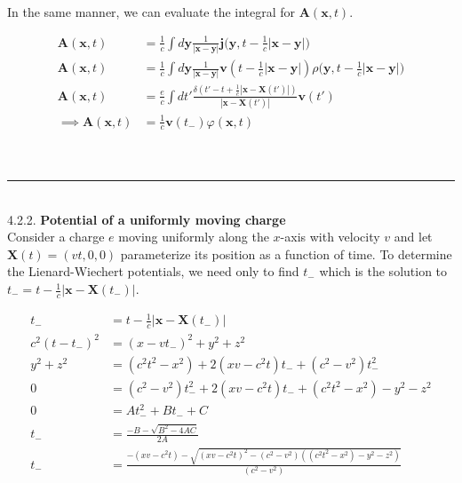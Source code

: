\documentclass{article}
\begin{document}
\hfill \\

In the same manner, we can evaluate the integral for $\bm{A}(\bm{x},t)$. 

\begin{equation}
\begin{split}
\bm{A}(\bm{x},t) & = \frac{1}{c} \int d\bm{y} \frac{1}{|\bm{x} - \bm{y}|} \bm{j} \Big( \bm{y}, t - \frac{1}{c}| \bm{x} - \bm{y} |  \Big)\\
\bm{A}(\bm{x},t) & = \frac{1}{c} \int d\bm{y} \frac{1}{|\bm{x} - \bm{y}|} \bm{v}(t - \frac{1}{c} |\bm{x} - \bm{y} |)  \rho\Big( \bm{y}, t - \frac{1}{c} |\bm{x} - \bm{y} | \Big)  \\
\bm{A}(\bm{x},t) & = \frac{e}{c}   \int  dt' \frac{   \delta \left(  t'  - t +  \frac{1}{c}| \bm{x} -  \bm{X} \left(  t'    \right) | \right)    }{|\bm{x} -  \bm{X} \left(  t'    \right)|} \bm{v}(t')   \\
\implies \bm{A}(\bm{x},t) & = \frac{1}{c}   \bm{v}(t_-)  \varphi( \bm{x},t)\\
\end{split}
\end{equation}


\hfill \\
\noindent\rule{15cm}{0.4pt} \\


4.2.2. {\bf Potential of a uniformly moving charge}
\hfill\\

Consider a charge $e$ moving uniformly along the $x$-axis with velocity $v$ and let $\bm{X}(t) = (vt,0,0)$ parameterize its position as a function of time. To determine the Lienard-Wiechert potentials, we need only to find $t_-$ which is the solution to $t_- = t - \frac{1}{c} | \bm{x} - \bm{X}(t_-) |$.

\begin{equation}
\begin{split}
t_- &= t - \frac{1}{c} | \bm{x} - \bm{X}(t_-) | \\
c^2(t - t_-)^2 & = (x-vt_-)^2 +  y^2  +  z^2 \\ 
 y^2 + z^2 & = (c^2t^2-x^2) + 2(xv - c^2t)t_- + (c^2-v^2)t_-^2    \\
0 & = (c^2-v^2)t_-^2 + 2(xv - c^2t)t_- + (c^2t^2-x^2) - y^2 - z^2 \\
0 &= At_-^2 + Bt_- + C  \\
t_- & = \frac{ -B - \sqrt{ B^2 - 4AC  }  }{2A} \\
t_- & = \frac{ -(xv - c^2t) - \sqrt{ (xv - c^2t)^2 - (c^2-v^2)((c^2t^2-x^2) - y^2 - z^2) }  }{(c^2-v^2)} \\
\end{split}
\end{equation}
\end{document}

